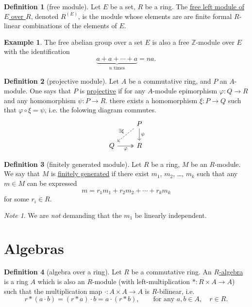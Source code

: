 \documentclass[a4paper,10pt]{scrreprt}
\newcommand{\Z}{\mathbb{Z}}
\newcommand{\defn}[1]{\ul{#1}}
\theoremstyle{definition}
\newtheorem{definition}{Definition}[section]
\newtheorem{example}{Example}[section]
\theoremstyle{plain}
\theoremstyle{remark}
\newtheorem{note}{Note}[section]
\begin{document}
\begin{definition}[free module]
  \label{def:freemodule}
  Let $E$ be a set, $R$ be a ring. The \defn{free left module of $E$ over $R$}, denoted $R^{(E)}$, is the module whose elements are are finite formal $R$-linear combinations of the elements of $E$.
\end{definition}

\begin{example}
  The free abelian group over a set $E$ is also a free $\Z$-module over $E$ with the identification
  \begin{equation*}
    \underbrace{a + a + \cdots + a}_{n\text{ times}} = na.
  \end{equation*}
\end{example}

\begin{definition}[projective module]
  \label{def:projectivemodule}
  Let $A$ be a commutative ring, and $P$ an $A$-module. One says that $P$ is \defn{projective} if for any $A$-module epimorphism $\varphi\colon Q \to R$ and any homomorphism $\psi\colon P \to R$. there exists a homomorphism $\xi\colon P \to Q$ such that $\varphi \circ \xi = \psi$, i.e. the folowing diagram commutes.
  \begin{equation*}
    \begin{tikzcd}
      & P
      \arrow[dl, swap, dashed, "\exists\xi"]
      \arrow[d, "\psi"]
      \\
      Q \arrow[r, swap, twoheadrightarrow, "\varphi"]
      & R
    \end{tikzcd}
  \end{equation*}
\end{definition}

\begin{definition}[finitely generated module]
  \label{def:finitelygeneratedmodule}
  Let $R$ be a ring, $M$ be an $R$-module. We say that $M$ is \defn{finitely generated} if there exist $m_{1}$, $m_{2}$, \dots, $m_{k}$ such that any $m \in M$ can be expressed 
  \begin{equation*}
    m = r_{1} m_{1} + r_{2} m_{2} + \cdots + r_{k} m_k
  \end{equation*}
  for some $r_{i} \in R$.
\end{definition}
\begin{note}
  We are \emph{not} demanding that the $m_{1}$ be linearly independent.
\end{note}

\section{Algebras}
\begin{definition}[algebra over a ring]
  \label{def:algebraoveraring}
  Let $R$ be a commutative ring. An \defn{$R$-algebra} is a ring $A$ which is also an $R$-module (with left-multiplication $*\colon R \times A \to A$) such that the multiplication map $\cdot\colon A \times A \to A$ is $R$-bilinear, i.e. 
  \begin{equation*}
    r*(a\cdot b) = (r*a)\cdot b = a\cdot (r*b),\qquad\text{for any }a,b \in A,\quad r \in R.
  \end{equation*}
\end{definition}
\end{document}
